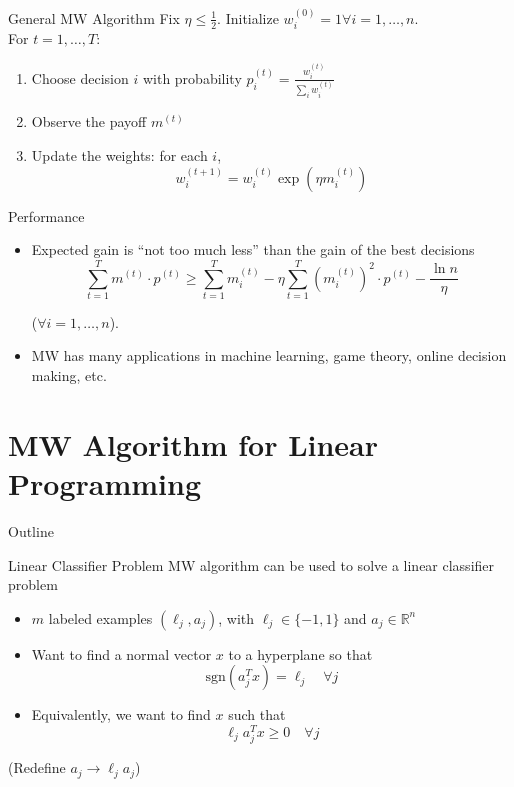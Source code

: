 \documentclass{beamer}
\begin{document}
\begin{frame}{General MW Algorithm}
Fix $\eta \leq \frac{1}{2}$. Initialize $w^{(0)}_i = 1 \forall i = 1,\ldots,n$.\\ \vspace{.5cm}
For $t = 1,\ldots, T$:
\begin{enumerate}
\setlength\itemsep{1.2em}
\item Choose decision $i$ with probability $p_i^{(t)} = \frac{w_i^{(t)}}{\sum_i w_i^{(t)}}$
\item Observe the payoff $m^{(t)}$
\item Update the weights: for each $i$, $$w_i^{(t+1)} = w_i^{(t)}\exp(\eta m_i^{(t)})$$
\end{enumerate}
\end{frame}

\begin{frame}{Performance}
\begin{itemize}
\item Expected gain is ``not too much less'' than the gain of the best decisions 
$$
\sum_{t=1}^T m^{(t)}\cdot p^{(t)} \geq \sum_{t=1}^T m_i^{(t)} - \eta \sum_{t=1}^T (m_i^{(t)})^2\cdot p^{(t)} - \frac{\ln n}{\eta}
$$

($\forall i = 1, \dots, n$).
\item MW has many applications in machine learning, game theory, online decision making, etc. %
\end{itemize}
\end{frame}

\section[MW for LP]{MW Algorithm for Linear Programming}
\begin{frame}{Outline}
  \tableofcontents[currentsection]
\end{frame}

\begin{frame}{Linear Classifier Problem}
MW algorithm can be used to solve a linear classifier problem
\begin{itemize}
\item $m$ labeled examples $(\ell_j, a_j)$, with $\ell_j \in \{-1,1\}$ and $a_j \in \mathbb{R}^n$ 
\item Want to find a normal vector $x$ to a hyperplane so that $$\text{sgn}(a_j^Tx) = \ell_j \quad \forall j$$
\item Equivalently, we want to find $x$ such that $$\ell_j a_j^Tx \geq 0 \quad \forall j$$
\end{itemize}
(Redefine $a_j \to \ell_j a_j$)
\end{frame}
\end{document}

